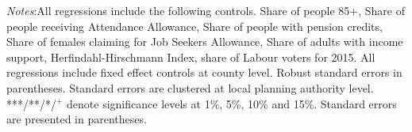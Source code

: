 \documentclass[12pt,letterpaper]{article}
\begin{document}
\begin{table}[h!]
\centering
\caption{Second stage results, effects on per capita expenditures}
\label{table expenditure}
\begin{tablenotes}
      \scriptsize
      \item {\it{Notes}}:All regressions include the following controls. Share of people 85+, 
      Share of people receiving Attendance Allowance, Share of people with pension credits, 
      Share of females claiming for Job Seekers Allowance, Share of adults with income 
      support, 
      Herfindahl-Hirschmann Index, share of Labour voters for 2015. All regressions include fixed effect controls at
      county level. Robust standard errors in parentheses. Standard errors are clustered at local planning 
      authority level. ***/**/*/$^{+}$ denote significance levels at 1\%, 5\%, 
      10\% and 15\%. Standard errors are presented in parentheses. 
    \end{tablenotes}

\end{table}
\end{document}
